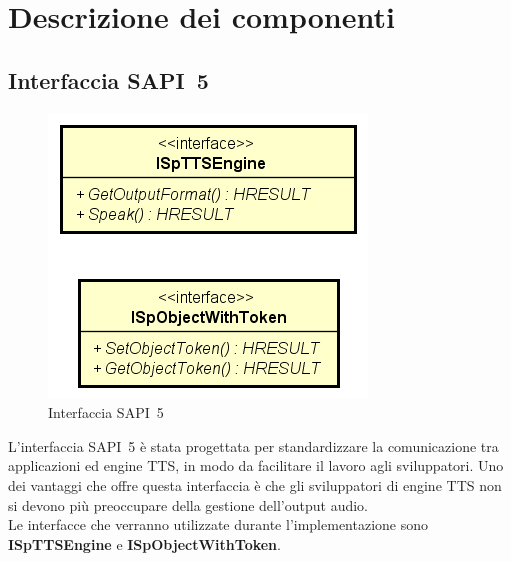 \chapter{Descrizione dei componenti}
\thispagestyle{empty}

\newpage
\section{Interfaccia SAPI~5}
\begin{figure}[H]
	\centering
	\includegraphics{images/sapi5-interface.png}
	\caption{Interfaccia SAPI~5}
\end{figure}

L'interfaccia SAPI~5 è stata progettata per standardizzare la comunicazione tra applicazioni ed engine TTS, in modo da facilitare il lavoro agli sviluppatori. Uno dei vantaggi che offre questa interfaccia è che gli sviluppatori di engine TTS non si devono più preoccupare della gestione dell'output audio.\\
Le interfacce che verranno utilizzate durante l'implementazione sono \textbf{ISpTTSEngine} e \textbf{ISpObjectWithToken}.
